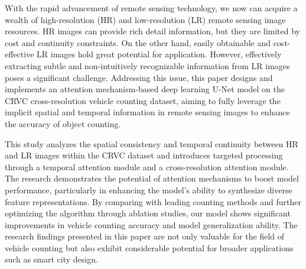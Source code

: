With the rapid advancement of remote sensing technology, we now can acquire a wealth of high-resolution (HR) and low-resolution (LR) remote sensing image resources. HR images can provide rich detail information, but they are limited by cost and continuity constraints. On the other hand, easily obtainable and cost-effective LR images hold great potential for application. However, effectively extracting subtle and non-intuitively recognizable information from LR images poses a significant challenge. Addressing this issue, this paper designs and implements an attention mechanism-based deep learning U-Net model on the CRVC cross-resolution vehicle counting dataset, aiming to fully leverage the implicit spatial and temporal information in remote sensing images to enhance the accuracy of object counting.

This study analyzes the spatial consistency and temporal continuity between HR and LR images within the CRVC dataset and introduces targeted processing through a temporal attention module and a cross-resolution attention module. The research demonstrates the potential of attention mechanisms to boost model performance, particularly in enhancing the model's ability to synthesize diverse feature representations. By comparing with leading counting methods and further optimizing the algorithm through ablation studies, our model shows significant improvements in vehicle counting accuracy and model generalization ability. The research findings presented in this paper are not only valuable for the field of vehicle counting but also exhibit considerable potential for broader applications such as smart city design. 